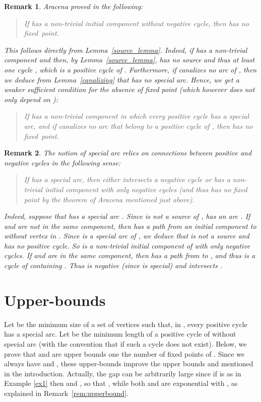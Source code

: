 \documentclass[11pt,a4paper]{article}
\newtheorem{remark}{Remark}
\begin{document}
\begin{remark}
{\em Aracena proved in \cite{A08} the following: 
\begin{quote}
{\em If  has a non-trivial initial component without negative cycle, then  has no fixed~point.} 
\end{quote}
This follows directly from Lemma~\ref{source_lemma}. Indeed, if  has a non-trivial component  and  then, by Lemma~\ref{source_lemma},  has no source and thus at least one cycle , which is a positive cycle of . Furthermore, if  canalizes no arc of , then we deduce from Lemma~\ref{canalizing} that  has no special arc. Hence, we get a weaker sufficient condition for the absence of fixed point (which however does not only depend on ):}
\begin{quote}
If  has a non-trivial component  in which every positive cycle has a special arc, and if  canalizes no arc that belong to a positive cycle of , then  has no fixed~point.
\end{quote}
\end{remark}

\begin{remark}
{\em The notion of special arc relies on connections between positive and negative cycles in the following sense:
\begin{quote}
{\em If  has a special arc, then either  intersects a negative cycle or  has a non-trivial initial component with only negative cycles} (and thus  has no fixed point by the theorem of Aracena mentioned just above). 
\end{quote}
Indeed, suppose that  has a special arc . Since  is not a source of ,  has an arc . If  and  are not in the same  component, then  has a path  from an initial component  to  without vertex in . Since  is a special arc of , we deduce that  is not a source and has no positive cycle. So  is a non-trivial initial component of  with only negative cycles. If  and  are in the same component, then  has a path  from  to , and thus  is a cycle of  containing . Thus  is negative (since  is special) and  intersects .}
\end{remark}

\section{Upper-bounds}\label{sec:upperbound}


Let  be the minimum size of a set of vertices  such that, in , every positive cycle has a special arc. Let  be the minimum length of a positive cycle of  without special arc (with the convention that  if such a cycle does not exist). Below, we prove that  and  are upper bounds one the number of fixed points of . Since we always have  and , these upper-bounds improve the upper bounds  and  mentioned in the introduction. Actually, the gap can be arbitrarily large since if  is as in Example \ref{ex1} then  and , so that , while both  and  are exponential with , as explained in Remark~\ref{rem:upperbound}. 
\end{document}
